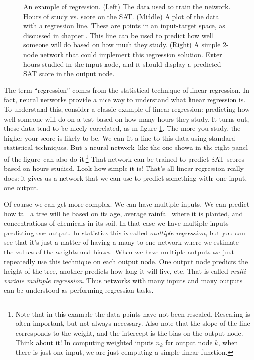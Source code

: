 \begin{figure}[h]
\hspace*{.4in}
\caption[Jeff Yoshimi.]{An example of regression. (Left) The data used to train the network. Hours of study vs. score on the SAT. (Middle) A plot of the data with a regression line. These are points in an input-target space, as discussed in chapter . This line can be used to predict how well someone will do based on how much they study. (Right) A simple 2-node network that could implement this regression solution. Enter hours studied in the input node, and it should display a  predicted SAT score in the output node.}
\label{F:linearRegression}
\end{figure}

The term ``regression'' comes from the statistical technique of linear regression. In fact, neural networks provide a nice way to understand what linear regression is. To understand this, consider a classic example of linear regression: predicting how well someone will do on a test based on how many hours they study. It turns out, these data tend to be nicely correlated, as in figure \ref{F:linearRegression}. The more you study, the higher your score is likely to be. We can fit a line to this data using standard statistical techniques. But a neural network--like the one shown in the right panel of the figure--can also do it.\footnote{Note that in this example the data points have not been rescaled. Rescaling is often important, but not always necessary. Also note that the slope of the line corresponds to the weight, and the intercept is the bias on the output node. Think about it!  In computing weighted inputs $n_k$ for output node $k$, when there is just one input, we are just computing a simple linear function.} That network can be trained to predict SAT scores based on hours studied. Look how simple it is!  That's all linear regression really does: it gives us a network that we can use to predict something with: one input, one output. 

Of course we can get more complex. We can have multiple inputs. We can  predict how tall a tree will be based on its age, average rainfall where it is planted, and concentrations of chemicals in its soil. In that case we have multiple inputs predicting one output. In statistics this is called \emph{multiple regression}, but you can see that it's just a matter of having  a many-to-one network where we estimate the values of the weights and biases. When we have multiple outputs we just repeatedly use this technique on each output node. One output node predicts the height of the tree, another predicts how long it will live, etc. That is called \emph{multi-variate multiple regression}. Thus networks with many inputs and many outputs can  be understood as performing regression tasks.

